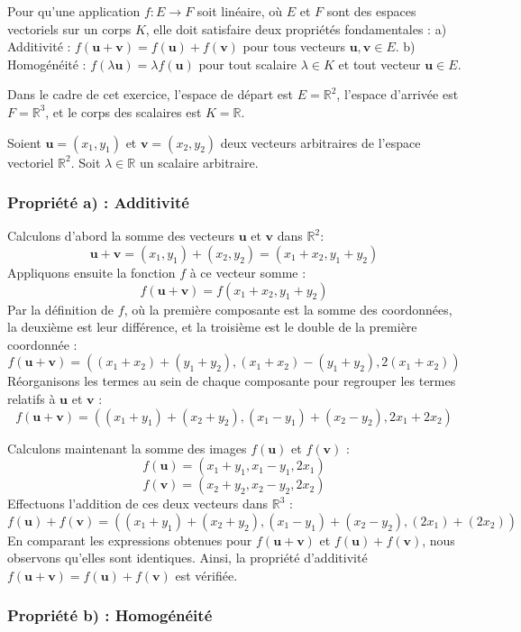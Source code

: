 \documentclass{report}
\begin{document}
Pour qu'une application $f: E \to F$ soit linéaire, où $E$ et $F$ sont des espaces vectoriels sur un corps $K$, elle doit satisfaire deux propriétés fondamentales :
a) Additivité : $f(\mathbf{u} + \mathbf{v}) = f(\mathbf{u}) + f(\mathbf{v})$ pour tous vecteurs $\mathbf{u}, \mathbf{v} \in E$.
b) Homogénéité : $f(\lambda \mathbf{u}) = \lambda f(\mathbf{u})$ pour tout scalaire $\lambda \in K$ et tout vecteur $\mathbf{u} \in E$.

Dans le cadre de cet exercice, l'espace de départ est $E = \mathbb{R}^2$, l'espace d'arrivée est $F = \mathbb{R}^3$, et le corps des scalaires est $K = \mathbb{R}$.

Soient $\mathbf{u} = (x_1, y_1)$ et $\mathbf{v} = (x_2, y_2)$ deux vecteurs arbitraires de l'espace vectoriel $\mathbb{R}^2$.
Soit $\lambda \in \mathbb{R}$ un scalaire arbitraire.

\subsubsection*{Propriété a) : Additivité}

Calculons d'abord la somme des vecteurs $\mathbf{u}$ et $\mathbf{v}$ dans $\mathbb{R}^2$:
$$\mathbf{u} + \mathbf{v} = (x_1, y_1) + (x_2, y_2) = (x_1+x_2, y_1+y_2)$$
Appliquons ensuite la fonction $f$ à ce vecteur somme :
$$f(\mathbf{u} + \mathbf{v}) = f(x_1+x_2, y_1+y_2)$$
Par la définition de $f$, où la première composante est la somme des coordonnées, la deuxième est leur différence, et la troisième est le double de la première coordonnée :
$$f(\mathbf{u} + \mathbf{v}) = ((x_1+x_2)+(y_1+y_2), (x_1+x_2)-(y_1+y_2), 2(x_1+x_2))$$
Réorganisons les termes au sein de chaque composante pour regrouper les termes relatifs à $\mathbf{u}$ et $\mathbf{v}$ :
$$f(\mathbf{u} + \mathbf{v}) = ((x_1+y_1)+(x_2+y_2), (x_1-y_1)+(x_2-y_2), 2x_1+2x_2)$$

Calculons maintenant la somme des images $f(\mathbf{u})$ et $f(\mathbf{v})$ :
$$f(\mathbf{u}) = (x_1+y_1, x_1-y_1, 2x_1)$$
$$f(\mathbf{v}) = (x_2+y_2, x_2-y_2, 2x_2)$$
Effectuons l'addition de ces deux vecteurs dans $\mathbb{R}^3$ :
$$f(\mathbf{u}) + f(\mathbf{v}) = ((x_1+y_1)+(x_2+y_2), (x_1-y_1)+(x_2-y_2), (2x_1)+(2x_2))$$
En comparant les expressions obtenues pour $f(\mathbf{u} + \mathbf{v})$ et $f(\mathbf{u}) + f(\mathbf{v})$, nous observons qu'elles sont identiques.
Ainsi, la propriété d'additivité $f(\mathbf{u} + \mathbf{v}) = f(\mathbf{u}) + f(\mathbf{v})$ est vérifiée.

\subsubsection*{Propriété b) : Homogénéité}
\end{document}

